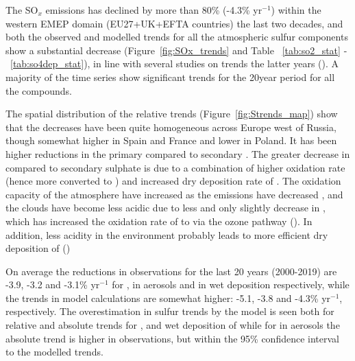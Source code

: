 The SO$_x$ emissions has declined by more than 80\% (-4.3\% yr$^{-1}$) within the western EMEP domain (EU27+UK+EFTA countries) the last two decades, and both the observed and modelled trends for all the atmospheric sulfur components show a substantial decrease (Figure~\ref{fig:SOx_trends} and Table ~\ref{tab:so2_stat} - ~\ref{tab:so4dep_stat}), in line with several studies on trends the latter years (\cite{aas2019global,TFMM2016, Vivanco2018, Theobald2019, Colette2021, Banzhaf2015, torseth2012, Crippa2016}). A majority of the time series show significant trends for the 20year period for all the compounds.

The spatial distribution of the relative trends (Figure~\ref{fig:Strends_map}) show that the decreases have been quite homogeneous across Europe west of Russia, though somewhat higher in Spain and France and lower in Poland. It has been higher reductions in the primary \soii compared to  secondary \soiv. The greater decrease in \soii compared to secondary sulphate is due to a combination of higher oxidation rate (hence more \soii converted to \soiv) and increased dry deposition rate of \soii. The oxidation capacity of the atmosphere have increased as the emissions have decreased \cite{Dalsoren2016}, and the clouds have become less acidic due to less \soii and only slightly decrease in \nhiii, which has increased the oxidation rate of \soii to \soiv via the ozone pathway (\cite{Banzhaf2015, Redington2009}). In addition, less acidity in the environment probably leads to more efficient dry deposition of \soii (\cite{Fowler_et_al:2009}) 

On average the reductions in observations for the last 20 years (2000-2019) are -3.9, -3.2 and -3.1\% yr$^{-1}$ for \soii, \soiv in aerosols and in wet deposition respectively, while the trends in model calculations are somewhat higher: -5.1, -3.8 and -4.3\% yr$^{-1}$, respectively. The overestimation in sulfur trends by the model is seen both for relative and absolute trends for \soii, and wet deposition of \soiv while for \soiv in aerosols the absolute trend is higher in observations, but within the 95\% confidence interval to the modelled trends.  

